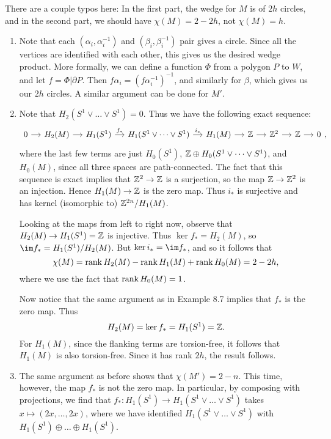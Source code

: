 \documentclass[../../solutions.tex]{subfiles}
\begin{document}
\begin{exercise} \leavevmode
There are a couple typos here:
In the first part, the wedge for $M$ is of $2h$ circles, and in the second part, we should have $\chi(M)=2-2h$, not $\chi(M)=h$.

\begin{enumerate}
\item
Note that each $(\alpha_i,\alpha_i^{-1})$ and $(\beta_i,\beta_i^{-1})$ pair gives a circle.
Since all the vertices are identified with each other, this gives us the desired wedge product.
More formally, we can define a function $\Phi$ from a polygon $P$ to $W$, and let $f=\Phi|\partial P$.
Then $f\alpha_i=(f\alpha_i^{-1})^{-1}$, and similarly for $\beta$, which gives us our $2h$ circles.
A similar argument can be done for $M'$.

\item
Note that $H_2(S^1\vee\dots\vee S^1)=0$.
Thus we have the following exact sequence:
\[
\begin{tikzcd}[column sep=small]
0\ar[r] & H_2(M)\ar[r] & H_1(S^1)\ar[r,"f_*"] & H_1(S^1\vee\dots\vee S^1)\ar[r,"i_*"] & H_1(M)\ar[r] & \ZZ\ar[r] & \ZZ^2\ar[r] & \ZZ\ar[r] & 0
\end{tikzcd},
\]
where the last few terms are just $H_0(S^1)$, $\mathbb{Z}\oplus H_0(S^1\vee\dots\vee S^1)$, and $H_0(M)$, since all three spaces are path-connected.
The fact that this sequence is exact implies that $\mathbb{Z}^2\to\mathbb{Z}$ is a surjection, so the map $\mathbb{Z}\to\mathbb{Z}^2$ is an injection.
Hence $H_1(M)\to\mathbb{Z}$ is the zero map.
Thus $i_*$ is surjective and has kernel (isomorphic to) $\mathbb{Z}^{2n}/H_1(M)$.

Looking at the maps from left to right now, observe that $H_2(M)\to H_1(S^1)=\mathbb{Z}$ is injective.
Thus $\ker f_*=H_2(M)$, so $\im f_*=H_1(S^1)/H_2(M)$.
But $\ker i_*=\im f_*$, and so it follows that
\[\chi(M)=\operatorname{rank} H_2(M)-\operatorname{rank} H_1(M)+\operatorname{rank} H_0(M)=2-2h,\]
where we use the fact that $\operatorname{rank} H_0(M)=1$.

Now notice that the same argument as in Example 8.7 implies that $f_*$ is the zero map.
Thus
\[H_2(M)=\ker f_*=H_1(S^1)=\mathbb{Z}.\]
For $H_1(M)$, since the flanking terms are torsion-free, it follows that $H_1(M)$ is also torsion-free.
Since it has rank $2h$, the result follows.

\item
The same argument as before shows that $\chi(M')=2-n$.
This time, however, the map $f_*$ is not the zero map.
In particular, by composing with projections, we find that $f_*:H_1(S^1)\to H_1(S^1\vee\dots\vee S^1)$ takes $x\mapsto(2x,\dots,2x)$, where we have identified $H_1(S^1\vee\dots\vee S^1)$ with $H_1(S^1)\oplus\dots\oplus H_1(S^1)$.


\end{enumerate}
\end{exercise}
\end{document}
